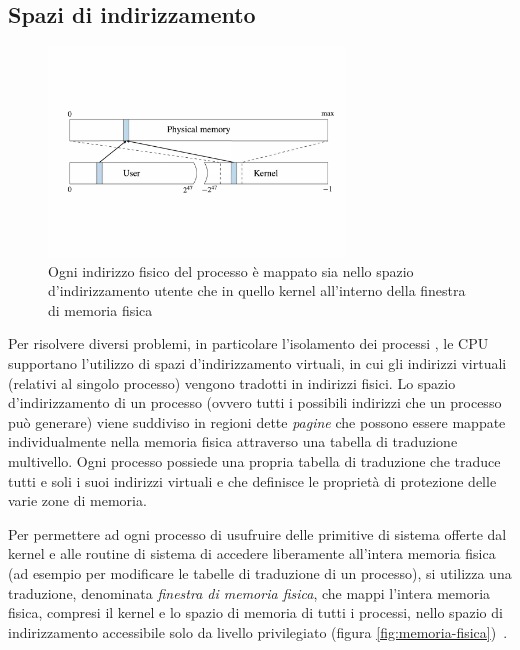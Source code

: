 \subsection{Spazi di indirizzamento}
\label{sec:spazi-di-indirizzamento}
\begin{figure}
	\centering
	\includegraphics[width=0.7\textwidth]{"img/memoria-fisica.pdf"}
	\caption{Ogni indirizzo fisico del processo è mappato sia nello spazio d'indirizzamento utente che in quello kernel all'interno della finestra di memoria fisica}
	\label{fig:memoria-fisica}
\end{figure}

Per risolvere diversi problemi, in particolare l'isolamento dei processi \cite{lettieri:paginazione}, le CPU supportano l'utilizzo di spazi d'indirizzamento virtuali, in cui gli indirizzi virtuali (relativi al singolo processo) vengono tradotti in indirizzi fisici. 
Lo spazio d'indirizzamento di un processo (ovvero tutti i possibili indirizzi che un processo può generare) viene suddiviso in regioni dette \emph{pagine} che possono essere mappate individualmente nella memoria fisica attraverso una tabella di traduzione multivello. 
Ogni processo possiede una propria tabella di traduzione che traduce tutti e soli i suoi indirizzi virtuali e che definisce le proprietà di protezione delle varie zone di memoria. 

Per permettere ad ogni processo di usufruire delle primitive di sistema offerte dal kernel e alle routine di sistema di accedere liberamente all'intera memoria fisica (ad esempio per modificare le tabelle di traduzione di un processo), si utilizza una traduzione, denominata \emph{finestra di memoria fisica}, che mappi l'intera memoria fisica, compresi il kernel e lo spazio di memoria di tutti i processi, nello spazio di indirizzamento accessibile solo da livello privilegiato (figura \vref{fig:memoria-fisica})~\cite{lettieri:paginazione-complementi}.


